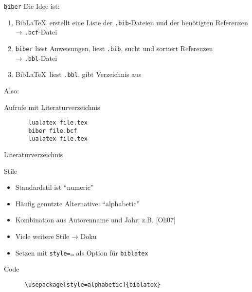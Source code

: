 \begin{frame}[fragile]{
  \texttt{biber} \hfill
}
  Die Idee ist:
  \begin{enumerate}
    \item Bib\LaTeX\ erstellt eine Liste der \texttt{.bib}-Dateien und der benötigten Referenzen \\
      → \texttt{.bcf}-Datei
    \item \texttt{biber} liest Anweisungen, liest \texttt{.bib}, sucht und sortiert Referenzen \\
      → \texttt{.bbl}-Datei
    \item Bib\LaTeX\ liest \texttt{.bbl}, gibt Verzeichnis aus
  \end{enumerate}

  \vspace{10pt}
  Also:
  \begin{block}{Aufrufe mit Literaturverzeichnis}
    \begin{lstlisting}
       lualatex file.tex
       biber file.bcf
       lualatex file.tex
    \end{lstlisting}
  \end{block}
\end{frame}

\begin{frame}{Literaturverzeichnis}
  \nocite{*}
  \printbibliography[heading=none]
\end{frame}

\begin{frame}[fragile]{Stile}
  \begin{itemize}
    \item Standardstil ist \enquote{numeric}
    \item Häufig genutzte Alternative: \enquote{alphabetic}
    \item Kombination aus Autorenname und Jahr: z.B. [Oli07]
    \item Viele weitere Stile → Doku
    \item Setzen mit \texttt{style=…} als Option für \texttt{biblatex}
  \end{itemize}
  \begin{block}{Code}
    \begin{lstlisting}
      \usepackage[style=alphabetic]{biblatex}
    \end{lstlisting}
  \end{block}
\end{frame}
